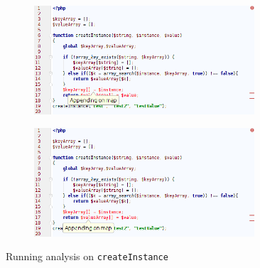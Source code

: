 \begin{figure}
\centering

\begin{subfigure}{\textwidth}
\centering
\includegraphics[width=0.9\textwidth]{chapters/caseStudy/screens/part1}
\label{fig:typeHandlerScreenshot-1}
\end{subfigure}

\begin{subfigure}{\textwidth}
\centering
\includegraphics[width=0.9\textwidth]{chapters/caseStudy/screens/part2}
\label{fig:typeHandlerScreenshot-2}
\end{subfigure}

\caption{Running analysis on \texttt{createInstance}}
\label{fig:typeHandlerScreenshot}
\end{figure}
